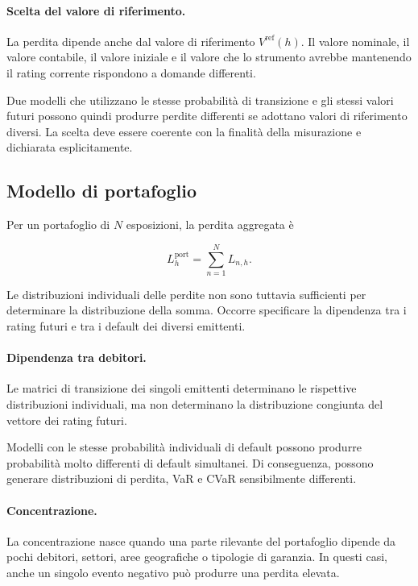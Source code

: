 \paragraph{Scelta del valore di riferimento.}

La perdita dipende anche dal valore di riferimento
$V^{\mathrm{ref}}(h)$. Il valore nominale, il valore contabile, il
valore iniziale e il valore che lo strumento avrebbe mantenendo il
rating corrente rispondono a domande differenti.

Due modelli che utilizzano le stesse probabilit\`{a} di transizione e
gli stessi valori futuri possono quindi produrre perdite differenti
se adottano valori di riferimento diversi. La scelta deve essere
coerente con la finalit\`{a} della misurazione e dichiarata
esplicitamente.

\subsection{Modello di portafoglio}

\label{subsec:cap9-limiti-portafoglio}

Per un portafoglio di $N$ esposizioni, la perdita aggregata \`{e}

\[
L_h^{\mathrm{port}}
=
\sum_{n=1}^{N}L_{n,h}.
\]

Le distribuzioni individuali delle perdite non sono tuttavia
sufficienti per determinare la distribuzione della somma. Occorre
specificare la dipendenza tra i rating futuri e tra i default dei
diversi emittenti.

\paragraph{Dipendenza tra debitori.}

Le matrici di transizione dei singoli emittenti determinano le
rispettive distribuzioni individuali, ma non determinano la
distribuzione congiunta del vettore dei rating futuri.

Modelli con le stesse probabilit\`{a} individuali di default possono
produrre probabilit\`{a} molto differenti di default simultanei. Di
conseguenza, possono generare distribuzioni di perdita, VaR e CVaR
sensibilmente differenti.

\paragraph{Concentrazione.}

La concentrazione nasce quando una parte rilevante del portafoglio
dipende da pochi debitori, settori, aree geografiche o tipologie di
garanzia. In questi casi, anche un singolo evento negativo pu\`{o}
produrre una perdita elevata.

